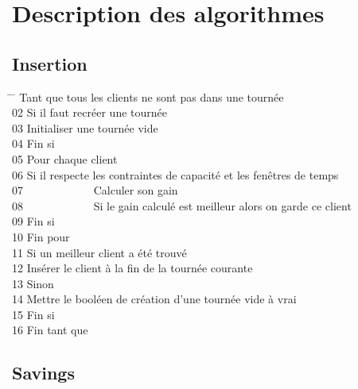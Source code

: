 \documentclass[12pt]{article}
\begin{document}
\clearpage
\section{Description des algorithmes}

\subsection{Insertion}

\begin{tabbing}
\hspace{1cm} \= \hspace{1cm} \=   Tant que tous les clients ne sont pas dans une tournée\\
02  \> Si il faut recréer une tournée\\
03  \> \> Initialiser une tournée vide \\
04  \> Fin si\\
05  \> Pour chaque client\\
06  \> \> Si il respecte les contraintes de capacité et les fenêtres de temps \\
07  \> \> \ \ \ \ \ \ \ \ \ \ \ \ Calculer son gain\\
08  \> \> \ \ \ \ \ \ \ \ \ \ \ \ Si le gain calculé est meilleur alors on garde ce client \\
09  \> \> Fin si \\
10  \> Fin pour \\
11  \> Si un meilleur client a été trouvé \\
12  \> \> Insérer le client à la fin de la tournée courante\\
13  \> Sinon \\
14  \> \> Mettre le booléen de création d'une tournée vide à vrai \\
15  \> Fin si \\
16  Fin tant que \\
\end{tabbing}

\subsection{Savings}
\end{document}
